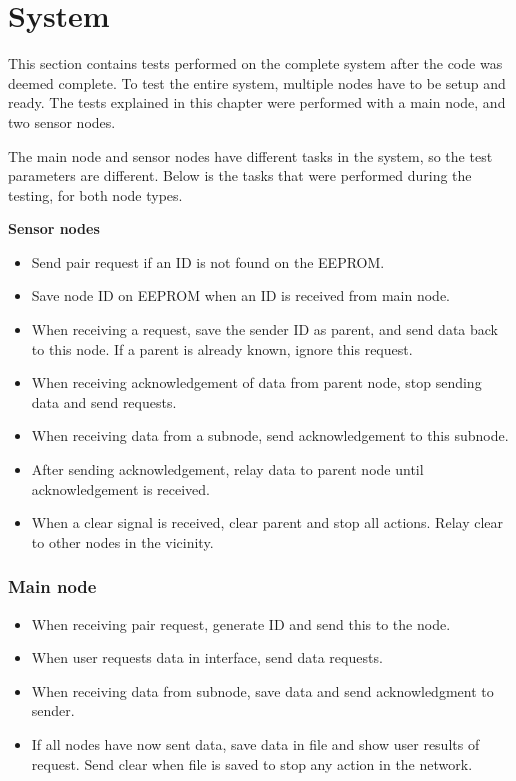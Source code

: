 \section{System}
This section contains tests performed on the complete system after the code was deemed complete. To test the entire system, multiple nodes have to be setup and ready. The tests explained in this chapter were performed with a main node, and two sensor nodes.

The main node and sensor nodes have different tasks in the system, so the test parameters are different. Below is the tasks that were performed during the testing, for both node types.

\textbf{Sensor nodes} \\
\begin{itemize}
\item Send pair request if an ID is not found on the EEPROM.
\item Save node ID on EEPROM when an ID is received from main node.
\item When receiving a request, save the sender ID as parent, and send data back to this node. If a parent is already known, ignore this request.
\item When receiving acknowledgement of data from parent node, stop sending data and send requests.
\item When receiving data from a subnode, send acknowledgement to this subnode.
\item After sending acknowledgement, relay data to parent node until acknowledgement is received.
\item When a clear signal is received, clear parent and stop all actions. Relay clear to other nodes in the vicinity.
\end{itemize}


\subsubsection*{Main node}
\begin{itemize}
\item When receiving pair request, generate ID and send this to the node.
\item When user requests data in interface, send data requests.
\item When receiving data from subnode, save data and send acknowledgment to sender.
\item If all nodes have now sent data, save data in file and show user results of request. Send clear when file is saved to stop any action in the network.
\end{itemize}


